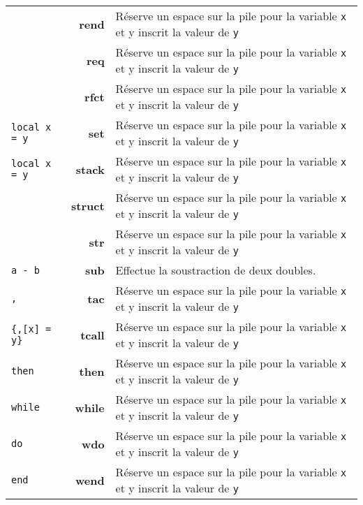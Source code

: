 \documentclass{article}
\begin{document}
\begin{longtable}{p{1.3cm} r p{12cm}}
   & \textbf{rend} & Réserve un espace sur la pile pour la variable \texttt{x} et y inscrit la valeur de \texttt{y}\\
  {\lstset{style=lua}\lstinline$$} & \textbf{req} & Réserve un espace sur la pile pour la variable \texttt{x} et y inscrit la valeur de \texttt{y}\\
  {\lstset{style=lua}\lstinline$$} & \textbf{rfct} & Réserve un espace sur la pile pour la variable \texttt{x} et y inscrit la valeur de \texttt{y}\\
  {\lstset{style=lua}\lstinline$local x = y$} & \textbf{set} & Réserve un espace sur la pile pour la variable \texttt{x} et y inscrit la valeur de \texttt{y}\\
  {\lstset{style=lua}\lstinline$local x = y$} & \textbf{stack} & Réserve un espace sur la pile pour la variable \texttt{x} et y inscrit la valeur de \texttt{y}\\
  {\lstset{style=lua}\lstinline$$} & \textbf{struct} & Réserve un espace sur la pile pour la variable \texttt{x} et y inscrit la valeur de \texttt{y}\\
  {\lstset{style=lua}\lstinline$$} & \textbf{str} & Réserve un espace sur la pile pour la variable \texttt{x} et y inscrit la valeur de \texttt{y}\\
  {\lstinline$a - b$} & \textbf{sub} & Effectue la soustraction de deux doubles.\\
  {\lstset{style=lua}\lstinline$,$} & \textbf{tac} & Réserve un espace sur la pile pour la variable \texttt{x} et y inscrit la valeur de \texttt{y}\\
  {\lstset{style=lua}\lstinline${,[x] = y}$} & \textbf{tcall} & Réserve un espace sur la pile pour la variable \texttt{x} et y inscrit la valeur de \texttt{y}\\
  {\lstset{style=lua}\lstinline$then$} & \textbf{then} & Réserve un espace sur la pile pour la variable \texttt{x} et y inscrit la valeur de \texttt{y}\\
  {\lstset{style=lua}\lstinline$while$} & \textbf{while} & Réserve un espace sur la pile pour la variable \texttt{x} et y inscrit la valeur de \texttt{y}\\
  {\lstset{style=lua}\lstinline$do$} & \textbf{wdo} & Réserve un espace sur la pile pour la variable \texttt{x} et y inscrit la valeur de \texttt{y}\\
  {\lstset{style=lua}\lstinline$end$} & \textbf{wend} & Réserve un espace sur la pile pour la variable \texttt{x} et y inscrit la valeur de \texttt{y}\\

\end{longtable}
\end{document}
